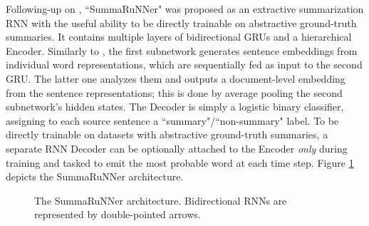 \documentclass[preprint,review,10pt]{elsarticle}
\begin{document}
	
	Following-up on \cite{lapata}, ``SummaRuNNer" \cite{nallapati} was proposed as an extractive summarization RNN with the useful ability to be directly trainable on abstractive ground-truth summaries. It contains multiple layers of bidirectional GRUs and a hierarchical Encoder. Similarly to \cite{lapata}, the first subnetwork generates sentence embeddings from individual word representations, which are sequentially fed as input to the second GRU. The latter one analyzes them and outputs a document-level embedding from the sentence representations; this is done by average pooling the second subnetwork's hidden states. The Decoder is simply a logistic binary classifier, assigning to each source sentence a ``summary"/``non-summary" label. To be directly trainable on datasets with abstractive ground-truth summaries, a separate RNN Decoder can be optionally attached to the Encoder \textit{only} during training and tasked to emit the most probable word at each time step. Figure \ref{fig::SummaRunner} depicts the SummaRuNNer architecture.
	
	
	\begin{figure}
		\centering
		
		\caption{The SummaRuNNer architecture. Bidirectional RNNs are represented by double-pointed arrows.}
		\label{fig::SummaRunner}
	\end{figure}
	
	
	
\end{document}
